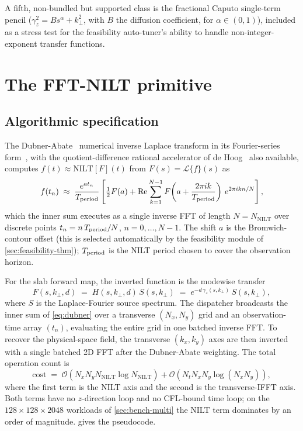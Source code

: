\documentclass[manuscript,review]{acmart}
\newcommand{\kperp}{k_\perp}
\newcommand{\gammaz}{\gamma_z}
\newcommand{\Real}{\operatorname{Re}}
\begin{document}
A fifth, non-bundled but supported class is the fractional Caputo
single-term pencil ($\gammaz^2 = B s^\alpha + \kperp^2$, with $B$
the diffusion coefficient, for
$\alpha \in (0,1)$), included as a stress test for the feasibility
auto-tuner's ability to handle non-integer-exponent transfer
functions.

\section{The FFT-NILT primitive}\label{sec:nilt-primitive}

\subsection{Algorithmic specification}

The Dubner-Abate~\cite{dubner1968} numerical inverse Laplace
transform in its Fourier-series form~\cite{crump1976}, with the
quotient-difference rational accelerator
of de Hoog~\cite{dehoog1982} also available, computes
$f(t) \approx \mathrm{NILT}[F](t)$ from
$F(s) = \mathcal{L}\{f\}(s)$ as
\begin{equation}
f(t_n) \;\approx\; \frac{e^{a t_n}}{T_{\rm period}}\left[\tfrac{1}{2} F(a) +
\Real \sum_{k=1}^{N-1} F\!\left(a + \frac{2\pi i k}{T_{\rm period}}\right)\,
e^{2\pi i k n / N}\right],
\label{eq:dubner}
\end{equation}
which the inner sum executes as a single inverse FFT of length
$N = N_{\mathrm{NILT}}$ over discrete points $t_n = n\,T_{\rm period}/N$,
$n = 0, \ldots, N-1$. The shift $a$ is the Bromwich-contour offset
(this is selected automatically by the feasibility module of
\cref{sec:feasibility-thm}); $T_{\rm period}$ is the NILT period
chosen to cover the observation horizon.

For the slab forward map, the inverted function is the modewise
transfer
\begin{equation}
F(s, \kperp, d) \;=\; H(s, \kperp, d)\,S(s, \kperp)
\;=\; e^{-d\,\gammaz(s, \kperp)}\,S(s, \kperp),
\end{equation}
where $S$ is the Laplace-Fourier source spectrum. The dispatcher
broadcasts the inner sum of \cref{eq:dubner} over a transverse
$(N_x, N_y)$ grid and an observation-time array $(t_n)$, evaluating
the entire grid in one batched inverse FFT. To recover the
physical-space field, the transverse $(k_x, k_y)$ axes are then
inverted with a single batched 2D FFT after the Dubner-Abate
weighting. The total operation count is
\begin{equation}
\mathrm{cost} \;=\;
\mathcal{O}\!\left(N_x N_y N_{\mathrm{NILT}}\log N_{\mathrm{NILT}}\right)
+ \mathcal{O}\!\left(N_t N_x N_y \log(N_x N_y)\right),
\label{eq:cost}
\end{equation}
where the first term is the NILT axis and the second is the
transverse-IFFT axis. Both terms have no $z$-direction loop and no
CFL-bound time loop; on the $128 \times 128 \times 2048$ workloads of
\cref{sec:bench-multi} the NILT term dominates by an order of
magnitude.  gives the pseudocode.
\end{document}
